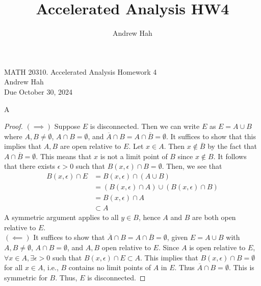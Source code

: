 \documentclass[12pt]{article}
\title{Accelerated Analysis HW4}
\author{Andrew Hah}
\begin{document}
\pagestyle{plain}
\begin{center}
{\Large MATH 20310. Accelerated Analysis Homework 4} \\ 
\vspace{.2in}  
Andrew Hah \\
Due October 30, 2024
\end{center}

\begin{exercise}{A}
    \begin{proof}
        $(\implies)$ Suppose $E$ is disconnected. Then we can write $E$ as $E = A \cup B$ where $A, B \neq \emptyset$, $A \cap B = \emptyset$, and $\overline{A} \cap B = A \cap \overline{B} = \emptyset$. It suffices to show that this implies that $A, B$ are open relative to $E$. Let $x \in A$. Then $x \notin \overline{B}$ by the fact that $A \cap \overline{B} = \emptyset$. This means that $x$ is not a limit point of $B$ since $x \notin B$. It follows that there exists $\epsilon > 0$ such that $B(x, \epsilon) \cap B = \emptyset$. Then, we see that \begin{equation*}
            \begin{split}
                B(x, \epsilon) \cap E & = B(x, \epsilon) \cap (A \cup B) \\
                & = (B(x, \epsilon) \cap A) \cup (B(x, \epsilon) \cap B) \\
                & = B(x, \epsilon) \cap A \\
                & \subset A
            \end{split}
        \end{equation*} 
        A symmetric argument applies to all $y \in B$, hence $A$ and $B$ are both open relative to $E$. \\
        $(\impliedby)$ It suffices to show that $\overline{A} \cap B = A \cap \overline{B} = \emptyset$, given $E = A \cup B$ with $A, B \neq \emptyset$, $A \cap B = \emptyset$, and $A, B$ open relative to $E$. Since $A$ is open relative to $E$, $\forall x \in A, \exists \epsilon > 0$ such that $B(x, \epsilon) \cap E \subset A$. This implies that $B(x, \epsilon) \cap B = \emptyset$ for all $x \in A$, i.e., $B$ contains no limit points of $A$ in $E$. Thus $\overline{A} \cap B = \emptyset$. This is symmetric for $B$. Thus, $E$ is disconnected. 
    \end{proof}
\end{exercise}
\end{document}
